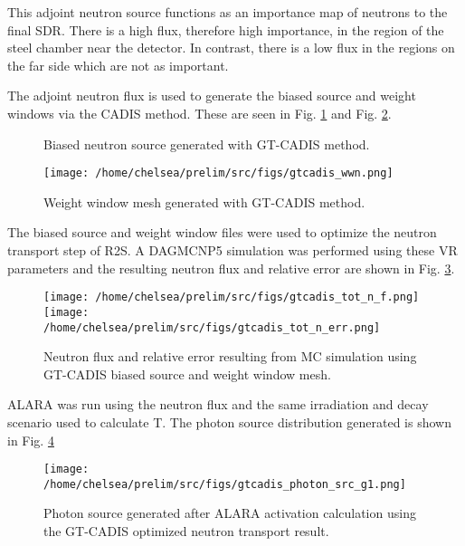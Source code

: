 This adjoint neutron source functions as an importance map of neutrons to the
final SDR.  There is a high flux, therefore high importance, in the region of the 
steel chamber near the detector.
In contrast, there is a low flux in the regions on the
far side which are not as important.

The adjoint neutron flux is used to generate the biased source and weight
windows via the CADIS method.  These are seen in Fig. \ref{fig:biased_src} and
Fig. \ref{fig:wwinp}.

\begin{figure} \label{fig:biased_src}
	\caption [GT-CADIS biased neutron source] 
	{Biased neutron source generated with GT-CADIS method.}
\end{figure}

\begin{figure} \label{fig:wwinp}
	\texttt{[image: /home/chelsea/prelim/src/figs/gtcadis\_wwn.png]}
	\caption [GT-CADIS weight window mesh]
	{Weight window mesh generated with GT-CADIS method.}
\end{figure}

The biased source and weight window files were used to optimize the neutron
transport step of R2S.  A DAGMCNP5 simulation was performed using these VR
parameters and the resulting neutron flux and relative error are shown in Fig.
\ref{fig:gt_nflux}.

\begin{figure} \label{fig:gt_nflux}
	\texttt{[image: /home/chelsea/prelim/src/figs/gtcadis\_tot\_n\_f.png]}
	\texttt{[image: /home/chelsea/prelim/src/figs/gtcadis\_tot\_n\_err.png]}
	\caption [GT-CADIS neutron flux and relative error] 
	{Neutron flux and relative error resulting from MC simulation using
	 GT-CADIS biased source and weight window mesh.}
\end{figure}

ALARA was run using the neutron flux and the same irradiation and decay scenario used to calculate
T.  The photon source distribution generated is shown in Fig. \ref{fig:gt_psrc}

\begin{figure} \label{fig:gt_psrc}
	\texttt{[image: /home/chelsea/prelim/src/figs/gtcadis\_photon\_src\_g1.png]}
	\caption [GT-CADIS photon source]
	{Photon source generated after ALARA activation calculation using the
	GT-CADIS optimized neutron transport result.}
\end{figure}



